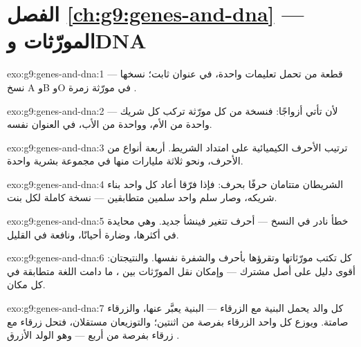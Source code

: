 \section*{الفصل \ref{ch:g9:genes-and-dna} --- المورّثات وDNA}

\begin{solution}{exo:g9:genes-and-dna:1}
 قطعة من  تحمل تعليمات  واحدة، في عنوان
ثابت؛  نسخها --- نسخ A وB وO في مورّثة زمرة
.
\end{solution}

\begin{solution}{exo:g9:genes-and-dna:2}
لأن  تأتي أزواجًا: فنسخة من كل مورّثة تركب كل
شريك --- واحدة من الأم، وواحدة من الأب، في العنوان نفسه.
\end{solution}

\begin{solution}{exo:g9:genes-and-dna:3}
ترتيب الأحرف الكيميائية على امتداد الشريط. أربعة أنواع
من الأحرف، ونحو ثلاثة مليارات منها في مجموعة بشرية
واحدة.
\end{solution}

\begin{solution}{exo:g9:genes-and-dna:4}
الشريطان متتامان حرفًا بحرف: فإذا فرّقا أعاد كل واحد
بناء شريكه، وصار سلم واحد سلمين متطابقين --- نسخة كاملة
لكل  بنت.
\end{solution}

\begin{solution}{exo:g9:genes-and-dna:5}
خطأ نادر في النسخ --- أحرف تتغير فينشأ  جديد. وهي
محايدة في أكثرها، وضارة أحيانًا، ونافعة في القليل.
\end{solution}

\begin{solution}{exo:g9:genes-and-dna:6}
كل  تكتب مورّثاتها وتقرؤها بأحرف 
والشفرة نفسها. والنتيجتان: أقوى دليل على أصل مشترك ---
وإمكان نقل المورّثات بين ، ما دامت اللغة متطابقة
في كل مكان.
\end{solution}

\begin{solution}{exo:g9:genes-and-dna:7}
كل والد يحمل البنية مع الزرقاء --- البنية يعبَّر عنها،
والزرقاء صامتة. ويوزع كل واحد الزرقاء بفرصة من اثنتين؛
والتوزيعان مستقلان، فتحل زرقاء مع زرقاء بفرصة من أربع
--- وهو الولد الأزرق .
\end{solution}

